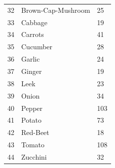 \begin{table}[h]
{\begin{tabular}{lll}
32       & Brown-Cap-Mushroom  & 25 \\
33       & Cabbage  & 19 \\
34       & Carrots  & 41 \\
35       & Cucumber  & 28 \\
36       & Garlic  & 24 \\
37       & Ginger  & 19 \\
38        & Leek  & 23 \\
39      & Onion  & 34 \\
40       & Pepper  & 103 \\
41       & Potato  & 73 \\
42       & Red-Beet  & 18 \\
43       & Tomato  & 108 \\
44       & Zucchini  & 32 \\
\hline
\end{tabular}
}
\label{table: p-result}
\end{table}